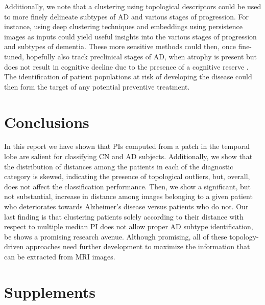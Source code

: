 \documentclass{article}
\begin{document}
Additionally, we note that a clustering using topological descriptors could be used to more finely
delineate subtypes of AD and various stages of progression. For instance, using deep clustering
techniques and embeddings using persistence images as inputs could yield useful insights into the
various stages of progression and subtypes of dementia. These more sensitive methods could then,
once fine-tuned, hopefully also track preclinical stages of AD, when atrophy is present but does not
result in cognitive decline due to the presence of a cognitive reserve
\citep{scarmeas2004cognitive, van2017neuroimaging}. The identification of patient populations at
risk of developing the disease could then form the target of any potential preventive treatment.

\section{Conclusions}

In this report we have shown that PIs computed from a patch in the temporal lobe are salient for
classifying CN and AD subjects. Additionally, we show that the distribution of distances among the
patients in each of the diagnostic category is skewed, indicating the presence of topological
outliers, but, overall, does not affect the classification performance. Then, we show a significant,
but not substantial, increase in distance among images belonging to a given patient who deteriorates
towards Alzheimer's disease versus patients who do not. Our last finding is that clustering patients
solely according to their distance with respect to multiple median PI does not allow proper AD
subtype identification, be shows a promising research avenue. Although promising, all of these
topology-driven approaches need further development to maximize the information that can be
extracted from MRI images.

\clearpage



\clearpage
\appendix

\section{Supplements}
\end{document}
